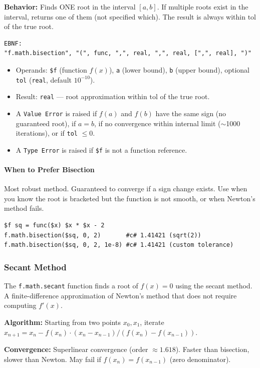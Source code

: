 \textbf{Behavior:} Finds ONE root in the interval $[a, b]$. If multiple roots exist in the interval, returns one of them (not specified which). The result is always within $\text{tol}$ of the true root.

\begin{verbatim}
EBNF:
"f.math.bisection", "(", func, ",", real, ",", real, [",", real], ")"
\end{verbatim}
\begin{itemize}
\item Operands: \texttt{\$f} (function $f(x)$), \texttt{a} (lower bound), \texttt{b} (upper bound), optional \texttt{tol} (\texttt{real}, default $10^{-10}$).
\item Result: \texttt{real} --- root approximation within $\text{tol}$ of the true root.
\item A \texttt{Value Error} is raised if $f(a)$ and $f(b)$ have the same sign (no guaranteed root), if $a = b$, if no convergence within internal limit ($\sim$1000 iterations), or if \texttt{tol} $\leq 0$.
\item A \texttt{Type Error} is raised if \texttt{\$f} is not a function reference.
\end{itemize}

\paragraph{When to Prefer Bisection}
Most robust method. Guaranteed to converge if a sign change exists. Use when you know the root is bracketed but the function is not smooth, or when Newton's method fails.

\begin{verbatim}
$f sq = func($x) $x * $x - 2
f.math.bisection($sq, 0, 2)       #c# 1.41421 (sqrt(2))
f.math.bisection($sq, 0, 2, 1e-8) #c# 1.41421 (custom tolerance)
\end{verbatim}

\subsubsection{Secant Method}
The \texttt{f.math.secant} function finds a root of $f(x) = 0$ using the secant method. A finite-difference approximation of Newton's method that does not require computing $f'(x)$.

\textbf{Algorithm:} Starting from two points $x_0, x_1$, iterate $x_{n+1} = x_n - f(x_n) \cdot (x_n - x_{n-1}) / (f(x_n) - f(x_{n-1}))$.

\textbf{Convergence:} Superlinear convergence (order $\approx 1.618$). Faster than bisection, slower than Newton. May fail if $f(x_n) = f(x_{n-1})$ (zero denominator).

